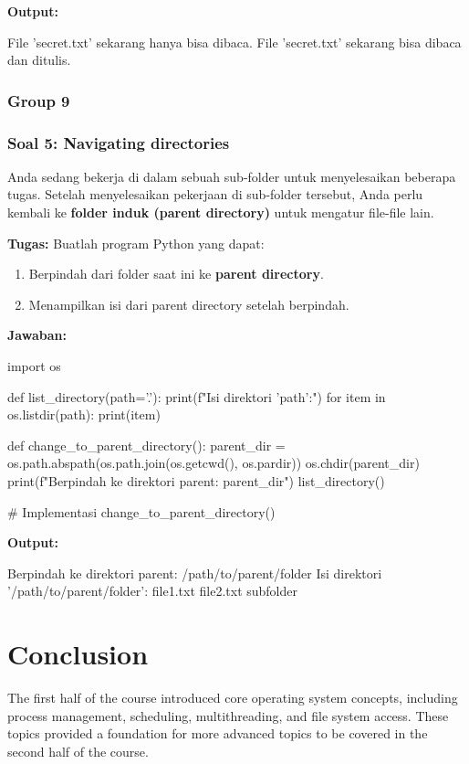 \documentclass[12pt]{article}
\begin{document}
\textbf{Output:}
\begin{python}
File 'secret.txt' sekarang hanya bisa dibaca.
File 'secret.txt' sekarang bisa dibaca dan ditulis.
\end{python}

\subsubsection{Group 9}
\subsubsection*{Soal 5: Navigating directories}
Anda sedang bekerja di dalam sebuah sub-folder untuk menyelesaikan beberapa tugas. Setelah menyelesaikan pekerjaan di sub-folder tersebut, Anda perlu kembali ke \textbf{folder induk (parent directory)} untuk mengatur file-file lain.

\textbf{Tugas:} Buatlah program Python yang dapat:
\begin{enumerate}
    \item Berpindah dari folder saat ini ke \textbf{parent directory}.
    \item Menampilkan isi dari parent directory setelah berpindah.
\end{enumerate}

\textbf{Jawaban:}
\begin{python}
import os

def list_directory(path='.'):
    print(f"Isi direktori '{path}':")
    for item in os.listdir(path):
        print(item)

def change_to_parent_directory():
    parent_dir = os.path.abspath(os.path.join(os.getcwd(), os.pardir))
    os.chdir(parent_dir)
    print(f"Berpindah ke direktori parent: {parent_dir}")
    list_directory()

# Implementasi
change_to_parent_directory()
\end{python}

\textbf{Output:}
\begin{python}
Berpindah ke direktori parent: /path/to/parent/folder
Isi direktori '/path/to/parent/folder':
file1.txt
file2.txt
subfolder
\end{python}

\section{Conclusion}
The first half of the course introduced core operating system concepts, including process management, scheduling, multithreading, and file system access. These topics provided a foundation for more advanced topics to be covered in the second half of the course.
\end{document}
